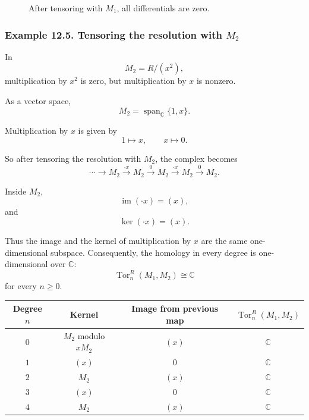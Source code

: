 \documentclass[12pt,a4paper]{article}
\theoremstyle{notespace}
\begin{document}
\begin{figure}[htbp]
	\centering
	\caption{After tensoring with \(M_1\), all differentials are zero.}
\end{figure}

\subsubsection*{Example 12.5. Tensoring the resolution with \(M_2\)}

In
\[
M_2=R/(x^2),
\]
multiplication by \(x^2\) is zero, but multiplication by \(x\) is nonzero.

As a vector space,
\[
M_2=\operatorname{span}_{\mathbb C}\{1,x\}.
\]

Multiplication by \(x\) is given by
\[
1\mapsto x,
\qquad
x\mapsto 0.
\]

So after tensoring the resolution with \(M_2\), the complex becomes
\[
\cdots
\longrightarrow
M_2
\xrightarrow{\cdot x}
M_2
\xrightarrow{0}
M_2
\xrightarrow{\cdot x}
M_2
\xrightarrow{0}
M_2.
\]

Inside \(M_2\),
\[
\operatorname{im}(\cdot x)=(x),
\]
and
\[
\ker(\cdot x)=(x).
\]

Thus the image and the kernel of multiplication by \(x\) are the same one-dimensional subspace. Consequently, the homology in every degree is one-dimensional over \(\mathbb C\):
\[
\operatorname{Tor}_n^R(M_1,M_2)\cong \mathbb C
\]
for every \(n\geq 0\).

\begin{center}
	\begin{tabular}{c|c|c|c}
		\textbf{Degree \(n\)} & \textbf{Kernel} & \textbf{Image from previous map} & \(\operatorname{Tor}_n^R(M_1,M_2)\)\\
		\hline
		\(0\) & \(M_2\) modulo \(xM_2\) & \((x)\) & \(\mathbb C\)\\
		\(1\) & \((x)\) & \(0\) & \(\mathbb C\)\\
		\(2\) & \(M_2\) & \((x)\) & \(\mathbb C\)\\
		\(3\) & \((x)\) & \(0\) & \(\mathbb C\)\\
		\(4\) & \(M_2\) & \((x)\) & \(\mathbb C\)
	\end{tabular}
\end{center}
\end{document}
